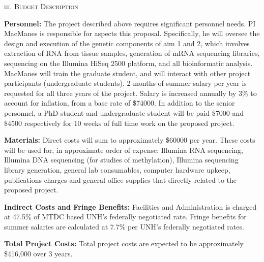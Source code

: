 \documentclass[12pt]{article}
\begin{document}
\begin{center}
\textsc{{iii. Budget Description}} \\
\end{center}

\textbf{Personnel:} The project described above requires significant personnel needs. PI MacManes is responsible for aspects this proposal. Specifically, he will oversee the design and execution of the genetic components of aim 1 and 2, which involves extraction of RNA from tissue samples, generation of mRNA sequencing libraries, sequencing on the Illumina HiSeq 2500 platform, and all bioinformatic analysis. MacManes will train the graduate student, and will interact with other project participants (undergraduate students). 2 months of summer salary per year is requested for all three years of the project. Salary is increased annually by 3\% to account for inflation, from a base rate of \$74000. In addition to the senior personnel, a PhD student and undergraduate student will be paid \$7000 and \$4500 respectively for 10 weeks of full time work on the proposed project. 

\textbf{Materials:} Direct costs will sum to approximately \$60000 per year. These costs will be used for, in approximate order of expense: Illumina RNA sequencing, Illumina DNA sequencing (for studies of methylation), Illumina sequencing library generation, general lab consumables, computer hardware upkeep, publications charges and general office supplies that directly related to the proposed project. 

\textbf{Indirect Costs and Fringe Benefits:} Facilities and Administration is charged at 47.5\% of MTDC based UNH’s federally negotiated rate. Fringe benefits for summer salaries are calculated at 7.7\% per UNH’s federally negotiated rates. 
 
\textbf{Total Project Costs:} Total project costs are expected to be approximately \$416,000 over 3 years.  

\singlespacing


\end{document}
